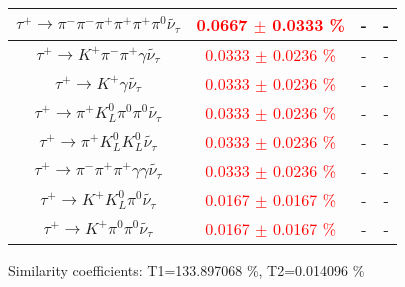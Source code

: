 {\begin{longtable}{|c|c|c|c|}
\hline 
 $\tau^{+} \rightarrow \pi^{-} \pi^{-} \pi^{+} \pi^{+} \pi^{+} \pi^{0} \widetilde{\nu_{\tau}} $ & \textcolor{red}{ 0.0667  $\pm$   0.0333 \% }&  - & - \\ 
\hline 
 $\tau^{+} \rightarrow K^{+} \pi^{-} \pi^{+} \gamma \widetilde{\nu_{\tau}} $ & \textcolor{red}{ 0.0333  $\pm$   0.0236 \% }&  - & - \\ 
\hline 
 $\tau^{+} \rightarrow K^{+} \gamma \widetilde{\nu_{\tau}} $ & \textcolor{red}{ 0.0333  $\pm$   0.0236 \% }&  - & - \\ 
\hline 
 $\tau^{+} \rightarrow \pi^{+} K_{L}^{0} \pi^{0} \pi^{0} \widetilde{\nu_{\tau}} $ & \textcolor{red}{ 0.0333  $\pm$   0.0236 \% }&  - & - \\ 
\hline 
 $\tau^{+} \rightarrow \pi^{+} K_{L}^{0} K_{L}^{0} \widetilde{\nu_{\tau}} $ & \textcolor{red}{ 0.0333  $\pm$   0.0236 \% }&  - & - \\ 
\hline 
 $\tau^{+} \rightarrow \pi^{-} \pi^{+} \pi^{+} \gamma \gamma \widetilde{\nu_{\tau}} $ & \textcolor{red}{ 0.0333  $\pm$   0.0236 \% }&  - & - \\ 
\hline 
 $\tau^{+} \rightarrow K^{+} K_{L}^{0} \pi^{0} \widetilde{\nu_{\tau}} $ & \textcolor{red}{ 0.0167  $\pm$   0.0167 \% }&  - & - \\ 
\hline 
 $\tau^{+} \rightarrow K^{+} \pi^{0} \pi^{0} \widetilde{\nu_{\tau}} $ & \textcolor{red}{ 0.0167  $\pm$   0.0167 \% }&  - & - \\ 
\hline 
\end{longtable}\par} 
\vspace{0.3cm} 
Similarity coefficients: T1=133.897068 \%, T2=0.014096 \% 

\newpage
\tableofcontents{}
